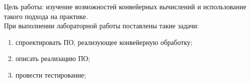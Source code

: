 \Introduction
Цель работы: изучение возможностей конвейерных вычислений и использование такого подхода на практике.\\
При выполнении лабораторной работы поставлены такие задачи:
\begin{enumerate}[1)]
	\item спроектировать ПО, реализующее конвейерную обработку;
	\item описать реализацию ПО;
	\item провести тестирование;
\end{enumerate}
